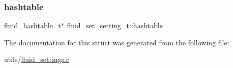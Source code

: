 \subsubsection{\texorpdfstring{hashtable}{hashtable}}
{\footnotesize\ttfamily \hyperlink{fluidsynth__priv_8h_a6cd032fa96f8ec0d47a5ba1a96f2f6c9}{fluid\+\_\+hashtable\+\_\+t}$\ast$ fluid\+\_\+set\+\_\+setting\+\_\+t\+::hashtable}



The documentation for this struct was generated from the following file\+:\begin{DoxyCompactItemize}
\item 
utils/\hyperlink{fluid__settings_8c}{fluid\+\_\+settings.\+c}\end{DoxyCompactItemize}
